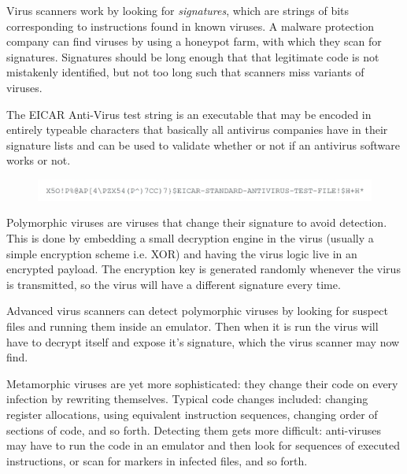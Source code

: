 \documentclass[../notes.tex]{subfiles}
\begin{document}
Virus scanners work by looking for \textit{signatures}, which are strings of bits corresponding to instructions found in known viruses. 
A malware protection company can find viruses by using a honeypot farm, with which they scan for signatures.
Signatures should be long enough that that legitimate code is not mistakenly identified, but not too long such that scanners miss variants of viruses.

\begin{blockquote}
    The EICAR Anti-Virus test string is an executable that may be encoded in entirely typeable characters that basically all antivirus companies have in their signature lists and can be used to validate whether or not if an antivirus software works or not.

    \begin{figure}[H]
        \centering
        \includegraphics[width=0.8\linewidth]{img/image_2023-04-03-18-37-01.png}
    \end{figure}

\end{blockquote}



Polymorphic viruses are viruses that change their signature to avoid detection. This is done by embedding a small decryption engine in the virus (usually a simple encryption scheme i.e. XOR) and having the virus logic live in an encrypted payload.
The encryption key is generated randomly whenever the virus is transmitted, so the virus will have a different signature every time.

Advanced virus scanners can detect polymorphic viruses by looking for suspect files and running them inside an emulator. Then when it is run the virus will have to decrypt itself and expose it's signature, which the virus scanner may now find.

Metamorphic viruses are yet more sophisticated: they change their code on every infection by rewriting themselves.
Typical code changes included: changing register allocations, using equivalent instruction sequences, changing order of sections of code, and so forth.
Detecting them gets more difficult: anti-viruses may have to run the code in an emulator and then look for sequences of executed instructions, or scan for markers in infected files, and so forth.
\end{document}
